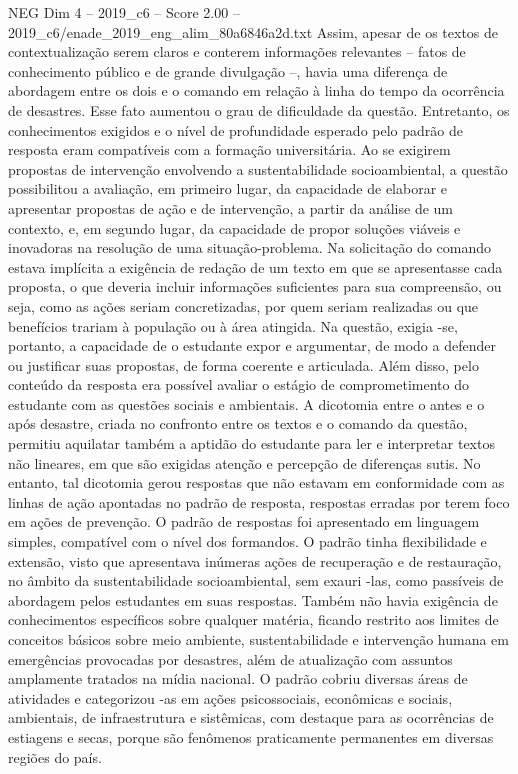 \begin{textsample}{NEG Dim 4 – 2019\_c6 – Score 2.00 – 2019\_c6/enade\_2019\_eng\_alim\_80a6846a2d.txt}
Assim, apesar de os textos de contextualização serem claros e conterem informações relevantes – fatos de conhecimento público e de grande divulgação –, havia uma diferença de abordagem entre os dois e o comando em relação à linha do tempo da ocorrência de desastres.
Esse fato aumentou o grau de dificuldade da questão.
Entretanto, os conhecimentos exigidos e o nível de profundidade esperado pelo padrão de resposta eram compatíveis com a formação universitária.
Ao se exigirem propostas de intervenção envolvendo a sustentabilidade socioambiental, a questão possibilitou a avaliação, em primeiro lugar, da capacidade de elaborar e apresentar propostas de ação e de intervenção, a partir da análise de um contexto, e, em segundo lugar, da capacidade de propor soluções viáveis e inovadoras na resolução de uma situação-problema.
Na solicitação do comando estava implícita a exigência de redação de um texto em que se apresentasse cada proposta, o que deveria incluir informações suficientes para sua compreensão, ou seja, como as ações seriam concretizadas, por quem seriam realizadas ou que benefícios trariam à população ou à área atingida.
Na questão, exigia -se, portanto, a capacidade de o estudante expor e argumentar, de modo a defender ou justificar suas propostas, de forma coerente e articulada.
Além disso, pelo conteúdo da resposta era possível avaliar o estágio de comprometimento do estudante com as questões sociais e ambientais.
A dicotomia entre o antes e o após desastre, criada no confronto entre os textos e o comando da questão, permitiu aquilatar também a aptidão do estudante para ler e interpretar textos não lineares, em que são exigidas atenção e percepção de diferenças sutis.
No entanto, tal dicotomia gerou respostas que não estavam em conformidade com as linhas de ação apontadas no padrão de resposta, respostas erradas por terem foco em ações de prevenção.
O padrão de respostas foi apresentado em linguagem simples, compatível com o nível dos formandos.
O padrão tinha flexibilidade e extensão, visto que apresentava inúmeras ações de recuperação e de restauração, no âmbito da sustentabilidade socioambiental, sem exauri -las, como passíveis de abordagem pelos estudantes em suas respostas.
Também não havia exigência de conhecimentos específicos sobre qualquer matéria, ficando restrito aos limites de conceitos básicos sobre meio ambiente, sustentabilidade e intervenção humana em emergências provocadas por desastres, além de atualização com assuntos amplamente tratados na mídia nacional.
O padrão cobriu diversas áreas de atividades e categorizou -as em ações psicossociais, econômicas e sociais, ambientais, de infraestrutura e sistêmicas, com destaque para as ocorrências de estiagens e secas, porque são fenômenos praticamente permanentes em diversas regiões do país.

\end{textsample}
